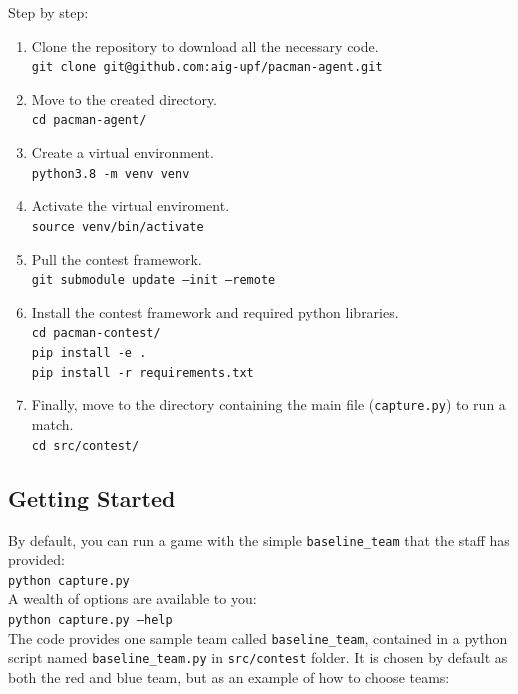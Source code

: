 \documentclass[11pt]{article}
\begin{document}
Step by step:
\begin{enumerate}
    \item Clone the repository to download all the necessary code.\\
    \texttt{git clone git@github.com:aig-upf/pacman-agent.git}
    \item Move to the created directory.\\
    \texttt{cd pacman-agent/}
    \item Create a virtual environment.\\
    \texttt{python3.8 -m venv venv}
    \item Activate the virtual enviroment.\\
    \texttt{source venv/bin/activate}
    \item Pull the contest framework.\\
    \texttt{git submodule update --init --remote}
    \item Install the contest framework and required python libraries.\\
    \texttt{cd pacman-contest/}\\
    \texttt{pip install -e .} \\
    \texttt{pip install -r requirements.txt} 
    \item Finally, move to the directory containing the main file (\texttt{capture.py}) to run a match.\\
    \texttt{cd src/contest/}
\end{enumerate}

\subsection{Getting Started}
By default, you can run a game with the simple \texttt{baseline\_team} that the staff has provided:
\\

\texttt{python capture.py}
\\

A wealth of options are available to you:
\\

\texttt{python capture.py --help}
\\

The code provides one sample team called \texttt{baseline\_team}, contained in a python script named \texttt{baseline\_team.py} in \texttt{src/contest} folder. It is chosen by default as both the red and blue team, but as an example of how to choose teams:
\\
\end{document}
